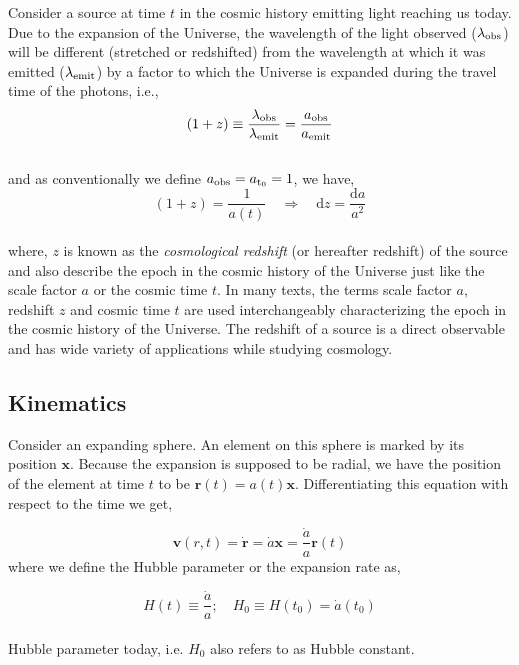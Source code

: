 Consider a source at time $t$ in the cosmic history emitting light reaching us today. 
Due to the expansion of the Universe, the wavelength of the light observed 
($\lambda_{\rm obs}$) will be different (stretched or redshifted) from the 
wavelength at which it was emitted ($\lambda_{\rm emit}$) by a factor to which
the Universe is expanded during the travel time of the photons, i.e.,
\begin{equation}
	(1+z) \equiv \dfrac{\lambda_{\rm obs}}{\lambda_{\rm emit}} = \dfrac{a_{\rm obs}}{a_{\rm emit}}
\end{equation}
\\
and as conventionally we define $a_{\rm obs} = a_{\rm t_0} = 1$, we have,
\begin{equation}
	(1+z) = \dfrac{1}{a(t)} \quad \Rightarrow \quad \mathrm{d}z = \dfrac{\mathrm{d}a}{a^2}
\end{equation}
\\
where, $z$ is known as the {\it cosmological redshift} (or hereafter redshift) 
of the source and also describe
the epoch in the cosmic history of the Universe just like the scale factor $a$ or 
the cosmic time $t$. In many texts, the terms scale factor 
$a$, redshift $z$ and cosmic time $t$ are used interchangeably 
characterizing the epoch in the cosmic history of the Universe. The redshift
of a source is a direct observable and has wide variety of 
applications while studying cosmology.



\subsection{Kinematics}


Consider an expanding sphere. An element on this sphere is marked by
its position $\mathbf{x}$. Because the expansion is supposed to be radial, we have the
position of the element at time $t$ to be $\mathbf{r}(t) = a(t) \mathbf{x}$. Differentiating 
this equation with respect to the time we get,

\begin{equation}
	\mathbf{v}(r,t) = \dot{\mathbf{r}} = \dot{a} \mathbf{x} = \dfrac{\dot{a}}{a} \mathbf{r}(t)
	\label{eqn:hubble}
\end{equation}
where we define the Hubble parameter or the expansion rate as,

\begin{equation}
	H(t) \equiv \dfrac{\dot{a}}{a};\quad H_0 \equiv H(t_0) = \dot{a}(t_0)
\end{equation}
\\
Hubble parameter today, i.e. $H_0$ also refers to as Hubble constant. 


